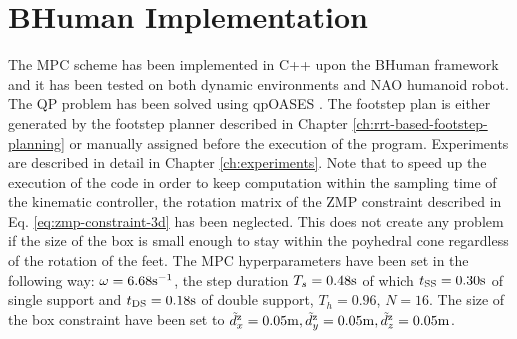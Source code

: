 \section{BHuman Implementation}
The MPC scheme has been implemented in C++ upon the BHuman framework
\cite{BHumanCodeRelease2018} and it has been tested on both dynamic environments 
and NAO humanoid robot. The QP problem has been solved using qpOASES
\cite{qpOASES}. The footstep plan is either generated by the footstep planner 
described in Chapter \ref{ch:rrt-based-footstep-planning} or manually assigned 
before the execution of the program. Experiments are described in detail in 
Chapter \ref{ch:experiments}. Note that to speed up the execution of the code 
in order to keep computation within the sampling time of the kinematic 
controller, the rotation matrix of the ZMP constraint described in Eq.
\eqref{eq:zmp-constraint-3d} has been neglected. This does not create any
problem if the size of the box is small enough to stay within the poyhedral 
cone regardless of the rotation of the feet. The MPC hyperparameters have been 
set in the following way: $\omega=6.68 {\rm s}^{-1}$,
the step duration $T_s=0.48 {\rm s}$ of which $t_{\rm SS}=0.30 {\rm s}$ of
single support and 
$t_{\rm DS}=0.18 {\rm s}$ of double support, $T_h=0.96$, $N=16$.
The size of the box constraint have 
been set to $\tilde{d}_x^{\rm z}=0.05 {\rm m}, \tilde{d}_y^{\rm z}=0.05 {\rm m},
\tilde{d}_z^{\rm z}=0.05 {\rm m}$.

